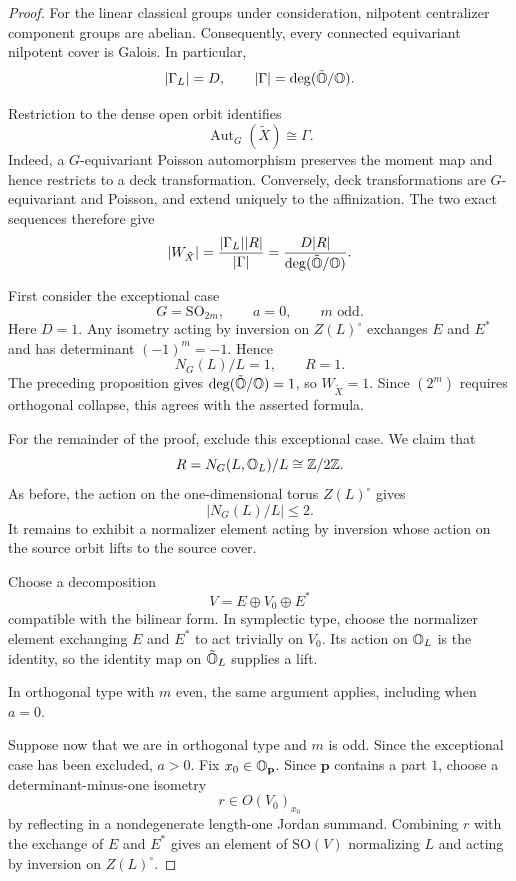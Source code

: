 \begin{proof}
  For the linear classical groups under consideration,
  nilpotent centralizer component groups are abelian.
  Consequently, every connected equivariant nilpotent
  cover is Galois. In particular,
  \[
    |\Gamma_L|=D,
    \qquad
    |\Gamma|=\deg(\tilde{\mathbb{O}}/\mathbb{O}).
  \]

  Restriction to the dense open orbit identifies
  \[
    \operatorname{Aut}_G(\tilde X)\cong\Gamma.
  \]
  Indeed, a $G$-equivariant Poisson automorphism
  preserves the moment map and hence restricts
  to a deck transformation. Conversely, deck
  transformations are $G$-equivariant and Poisson,
  and extend uniquely to the affinization.
  The two exact sequences therefore give
  \[
    |W_{\tilde X}|
    =
    \frac{|\Gamma_L||R|}{|\Gamma|}
    =
    \frac{D|R|}{\deg(\tilde{\mathbb{O}}/\mathbb{O})}.
  \]

  First consider the exceptional case
  \[
    G=\mathrm{SO}_{2m},\qquad a=0,\qquad m\text{ odd}.
  \]
  Here $D=1$.
  Any isometry acting by inversion on
  $Z(L)^\circ$ exchanges $E$ and $E^*$ and
  has determinant $(-1)^m=-1$.
  Hence
  \[
    N_G(L)/L=1,
    \qquad R=1.
  \]
  The preceding proposition gives
  $\deg(\tilde{\mathbb{O}}/\mathbb{O})=1$, so $W_{\tilde X}=1$.
  Since $(2^m)$ requires orthogonal collapse,
  this agrees with the asserted formula.

  For the remainder of the proof, exclude this
  exceptional case. We claim that
  \[
    R=N_G(L,\mathbb{O}_L)/L\cong\mathbb{Z}/2\mathbb{Z}.
  \]
  As before, the action on the one-dimensional
  torus $Z(L)^\circ$ gives
  \[
    |N_G(L)/L|\le2.
  \]
  It remains to exhibit a normalizer element
  acting by inversion whose action on the
  source orbit lifts to the source cover.

  Choose a decomposition
  \[
    V=E\oplus V_0\oplus E^*
  \]
  compatible with the bilinear form.
  In symplectic type, choose the normalizer
  element exchanging $E$ and $E^*$ to act
  trivially on $V_0$.
  Its action on $\mathbb{O}_L$ is the identity,
  so the identity map on $\tilde{\mathbb{O}}_L$
  supplies a lift.

  In orthogonal type with $m$ even, the same
  argument applies, including when $a=0$.

  Suppose now that we are in orthogonal type
  and $m$ is odd. Since the exceptional case
  has been excluded, $a>0$.
  Fix $x_0\in\mathbb{O}_{\mathbf p}$.
  Since $\mathbf p$ contains a part $1$,
  choose a determinant-minus-one isometry
  \[
    r\in O(V_0)_{x_0}
  \]
  by reflecting in a nondegenerate length-one
  Jordan summand.
  Combining $r$ with the exchange of $E$ and
  $E^*$ gives an element of $\mathrm{SO}(V)$
  normalizing $L$ and acting by inversion
  on $Z(L)^\circ$.


\end{proof}
